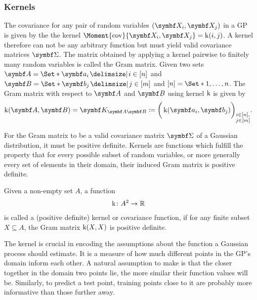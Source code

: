 \subsubsection{Kernels}
The covariance for any pair of random variables $(\rv{X}_i, \mat{X}_j)$ in a GP is given by the the kernel $\Moment{\cov}{\rv{X}_i, \rv{X}_j} = \K(i, j)$.
A kernel therefore can not be any arbitrary function but must yield valid covariance matrices $\mat{\Sigma}$.
The matrix obtained by applying a kernel pairwise to finitely many random variables is called the Gram matrix.
Given two sets $\mat{A} = \Set*{\mat{a}_i \with i \in [n]}$ and $\mat{B} = \Set*{\mat{b}_j \with j \in [m]}$ and $[n] = \Set*{1, \dots, n}$.
The Gram matrix with respect to $\mat{A}$ and $\mat{B}$ using kernel $\operatorname{k}$ is given by
\begin{align}
    \K(\mat{A}, \mat{B}) = \mat{K_{\mat{A}\mat{B}}} \coloneqq \bigg( \K(\mat{a}_i, \mat{b}_j) \bigg)_{\substack{i \in [n], \\ j \in [m]}}.
\end{align}

For the Gram matrix to be a valid covariance matrix $\mat{\Sigma}$ of a Gaussian distribution, it must be positive definite.
Kernels are functions which fulfill the property that for every possible subset of random variables, or more generally every set of elements in their domain, their induced Gram matrix is positive definite.
\begin{definition}[Kernel]
    Given a non-empty set $A$, a function
    \begin{align}
        \operatorname{k} \colon A^2 \to \mathbb{R}
    \end{align}
    is called a (positive definite) kernel or covariance function, if for any finite subset $X \subseteq A$, the Gram matrix $\operatorname{k}(X, X)$ is positive definite.
\end{definition}
The kernel is crucial in encoding the assumptions about the function a Gaussian process should estimate.
It is a measure of how much different points in the GP's domain inform each other.
A natural assumption to make is that the closer together in the domain two points lie, the more similar their function values will be.
Similarly, to predict a test point, training points close to it are probably more informative than those further away.

